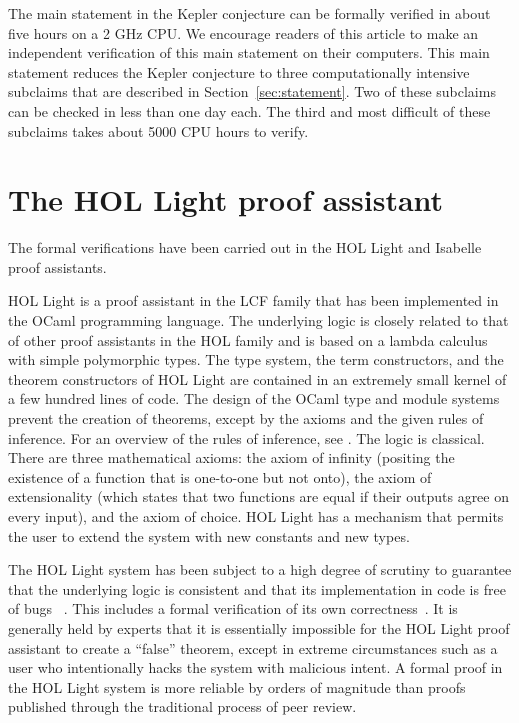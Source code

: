 
The main statement in the Kepler conjecture can be formally verified
in about five hours on a 2 GHz CPU.  We encourage readers of this
article to make an independent verification of this main statement on
their computers.  This main statement reduces the Kepler conjecture to
three computationally intensive subclaims that are described in
Section~\ref{sec:statement}.  Two of these subclaims can be checked in
less than one day each.  The third and most difficult of these
subclaims takes about 5000 CPU hours to verify.



\section{The HOL Light proof assistant}\label{sec:hl}

The formal verifications have been carried out in the HOL Light and
Isabelle proof assistants.

HOL Light is a proof assistant in the LCF family that has been
implemented in the OCaml programming language.  The underlying logic
is closely related to that of other proof assistants in the HOL family and
is based on a lambda calculus with simple polymorphic types. The type
system, the term constructors, and the theorem constructors of HOL
Light are contained in an extremely small kernel of a few hundred
lines of code.  The design of the OCaml type and module systems
prevent the creation of theorems, except by the axioms and the given
rules of inference.  For an overview of the rules of inference, see
\cite{harrison2009hol}.  The logic is classical.  There are three
mathematical axioms: the axiom of infinity (positing the existence of
a function that is one-to-one but not onto), the axiom of
extensionality (which states that two functions are equal if their
outputs agree on every input), and the axiom of choice.  HOL Light has
a mechanism that permits the user to extend the system with new
constants and new types.

The HOL Light system has been subject to a high degree of scrutiny to
guarantee that the underlying logic is consistent and that its
implementation in code is free of bugs~\cite{kumar2014hol}
\cite{hales-bourbaki2014}.  This includes a formal verification of its
own correctness~\cite{DBLP:conf/cade/Harrison06}.  It is generally
held by experts that it is essentially impossible for the HOL Light
proof assistant to create a ``false'' theorem, except in extreme
circumstances such as a user who intentionally hacks the system with
malicious intent.  A formal proof in the HOL Light system is more
reliable by orders of magnitude than proofs published through the
traditional process of peer review.


